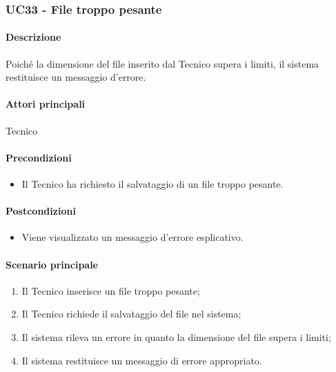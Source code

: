 \subsubsection{UC33 - File troppo pesante}\label{UC33}
\paragraph*{Descrizione}
Poiché la dimensione del file inserito dal Tecnico supera i limiti, il sistema restituisce un messaggio d'errore.

\paragraph*{Attori principali}
Tecnico

\paragraph*{Precondizioni}
\begin{itemize}
  \item Il Tecnico ha richiesto il salvataggio di un file troppo pesante.
\end{itemize}

\paragraph*{Postcondizioni}
\begin{itemize}
  \item Viene visualizzato un messaggio d'errore esplicativo.
\end{itemize}

\paragraph*{Scenario principale}
\begin{enumerate}
  \item Il Tecnico inserisce un file troppo pesante;
  \item Il Tecnico richiede il salvataggio del file nel sistema;
  \item Il sistema rileva un errore in quanto la dimensione del file supera i limiti;
  \item Il sistema restituisce un messaggio di errore appropriato.
\end{enumerate}